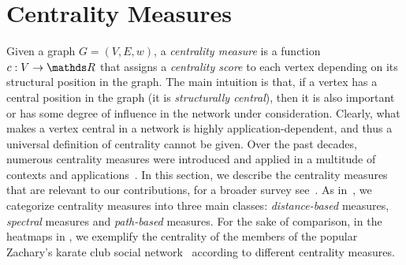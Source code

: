 \section{Centrality Measures}
\label{sec:centrality-measures}

Given a graph $G = (V, E, w)$, a \emph{centrality measure} is a function $c : V \to
\real$ that assigns a \emph{centrality score} to
each vertex depending on its structural position in the graph. The main
intuition is that, if a vertex has a central position in the graph (\ie it is
\emph{structurally central}), then it is also important or has some degree of
influence in the network under consideration.
Clearly, what makes a vertex central in a network is highly application-dependent,
and thus a universal definition of centrality cannot be given.
Over the past decades, numerous centrality measures were introduced and applied
in a multitude of contexts and
applications~\cite{cohn1958networks,pitts1965graph,action1993rise,
mackenzie1966structural,beauchamp1965improved,singh2022}.
%
In this section, we describe the centrality measures that are relevant to our
contributions, for a broader survey
see~\parencites[][Ch.~7.1]{DBLP:journals/socnet/Borgatti05,newman2018networks,
DBLP:journals/it/GrintenAM20}.
%
As in~\cite{DBLP:journals/im/BoldiV14}, we categorize centrality measures into
three main classes: \emph{distance-based} measures,
\emph{spectral} measures and \emph{path-based} measures.
%
For the sake of comparison, in the heatmaps in
, we exemplify the centrality of the members of
the popular Zachary's karate club social network~\cite{zachary1977information}
according to different centrality measures.


